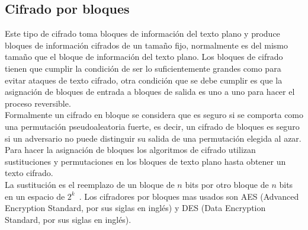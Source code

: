 \subsection{Cifrado por bloques}
Este tipo de cifrado toma bloques de información del texto plano y produce bloques de información cifrados de un tamaño fijo, normalmente es del mismo tamaño que el bloque de información del texto plano. Los bloques de cifrado tienen que cumplir la condición de ser lo suficientemente grandes como para evitar ataques de texto cifrado, otra condición que se debe cumplir es que la asignación de bloques de entrada a bloques de salida es uno a uno para hacer el proceso reversible.\\
Formalmente un cifrado en bloque se considera que es seguro si se comporta como una permutación pseudoaleatoria fuerte, es decir, un cifrado de bloques es seguro si un adversario no puede distinguir su salida de una permutación elegida al azar.\\
Para hacer la asignación de bloques los algoritmos de cifrado utilizan sustituciones y permutaciones en los bloques de texto plano hasta obtener un texto cifrado.\\
La sustitución es el reemplazo de un bloque de $n$ bits por otro bloque de $n$ bits en un espacio de 
$2^{k}$~\cite{bloc}. Los cifradores por bloques mas usados son AES (Advanced Encryption Standard, por sus 
siglas en ingl\'es) y DES (Data Encryption Standard, por sus siglas en ingl\'es).



